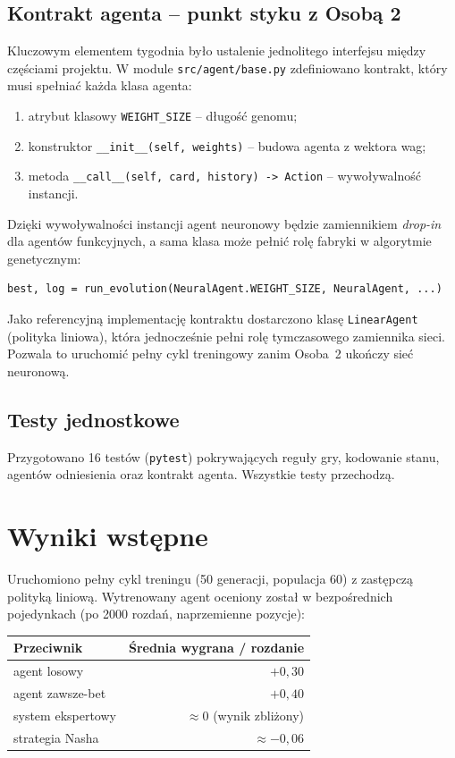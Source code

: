 \documentclass[12pt,a4paper]{article}
\begin{document}
\subsection{Kontrakt agenta -- punkt styku z Osobą 2}
Kluczowym elementem tygodnia było ustalenie jednolitego interfejsu
między częściami projektu. W module \texttt{src/agent/base.py}
zdefiniowano kontrakt, który musi spełniać każda klasa agenta:
\begin{enumerate}[nosep]
    \item atrybut klasowy \texttt{WEIGHT\_SIZE} -- długość genomu;
    \item konstruktor \texttt{\_\_init\_\_(self, weights)} -- budowa agenta z wektora wag;
    \item metoda \texttt{\_\_call\_\_(self, card, history) -> Action} -- wywoływalność instancji.
\end{enumerate}
Dzięki wywoływalności instancji agent neuronowy będzie zamiennikiem
\emph{drop-in} dla agentów funkcyjnych, a sama klasa może pełnić rolę
fabryki w algorytmie genetycznym:

\begin{lstlisting}
best, log = run_evolution(NeuralAgent.WEIGHT_SIZE, NeuralAgent, ...)
\end{lstlisting}

Jako referencyjną implementację kontraktu dostarczono klasę
\texttt{LinearAgent} (polityka liniowa), która jednocześnie pełni rolę
tymczasowego zamiennika sieci. Pozwala to uruchomić pełny cykl
treningowy zanim Osoba~2 ukończy sieć neuronową.

\subsection{Testy jednostkowe}
Przygotowano 16 testów (\texttt{pytest}) pokrywających reguły gry,
kodowanie stanu, agentów odniesienia oraz kontrakt agenta. Wszystkie
testy przechodzą.

\section{Wyniki wstępne}

Uruchomiono pełny cykl treningu (50 generacji, populacja 60) z
zastępczą polityką liniową. Wytrenowany agent oceniony został w
bezpośrednich pojedynkach (po 2000 rozdań, naprzemienne pozycje):

\begin{center}
\begin{tabular}{lr}
\toprule
Przeciwnik & Średnia wygrana / rozdanie \\ \midrule
agent losowy        & $+0{,}30$ \\
agent zawsze-bet    & $+0{,}40$ \\
system ekspertowy   & $\approx 0$ (wynik zbliżony) \\
strategia Nasha     & $\approx -0{,}06$ \\
\bottomrule
\end{tabular}
\end{center}
\end{document}
